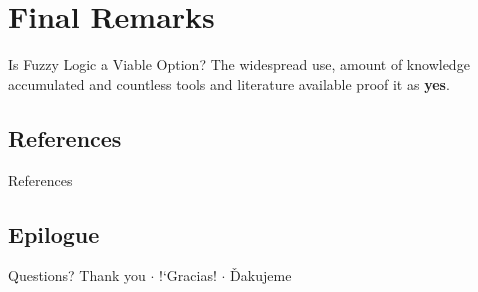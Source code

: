 \documentclass[hyperref={unicode}]{beamer}
\begin{document}
\section{Final Remarks}

\begin{frame}{Is Fuzzy Logic a Viable Option?}
	The widespread use, amount of knowledge accumulated and countless tools and literature available proof it as \textbf{yes}.
\end{frame}


\subsection{References}

\begin{frame}[allowframebreaks]{References}
	\printbibliography
\end{frame}


\subsection{Epilogue}

\begin{frame}{Questions?}
	\centering
	{\large Thank you $\cdot$ !`Gracias! $\cdot$ Ďakujeme}
\end{frame}
\end{document}
